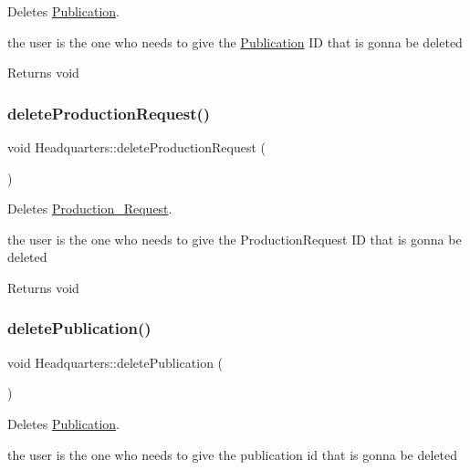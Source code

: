 Deletes \hyperlink{class_publication}{Publication}. 

the user is the one who needs to give the \hyperlink{class_publication}{Publication} ID that is gonna be deleted

\begin{DoxyReturn}{Returns}
void 
\end{DoxyReturn}
\mbox{\label{class_headquarters_a943b8cc7b3c1c8c8a126065897512b91}} 
\subsubsection{\texorpdfstring{delete\+Production\+Request()}{deleteProductionRequest()}}
{\footnotesize\ttfamily void Headquarters\+::delete\+Production\+Request (\begin{DoxyParamCaption}{ }\end{DoxyParamCaption})}



Deletes \hyperlink{class_production___request}{Production\+\_\+\+Request}. 

the user is the one who needs to give the Production\+Request ID that is gonna be deleted

\begin{DoxyReturn}{Returns}
void 
\end{DoxyReturn}
\mbox{\label{class_headquarters_a53dc212f35caf7e89661c0dfa000858f}} 
\subsubsection{\texorpdfstring{delete\+Publication()}{deletePublication()}}
{\footnotesize\ttfamily void Headquarters\+::delete\+Publication (\begin{DoxyParamCaption}{ }\end{DoxyParamCaption})}



Deletes \hyperlink{class_publication}{Publication}. 

the user is the one who needs to give the publication id that is gonna be deleted

